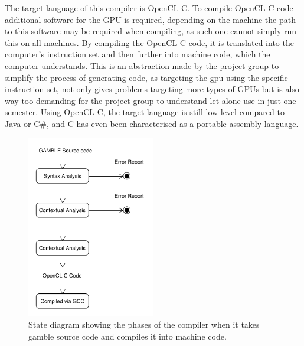 The target language of this compiler is OpenCL C.
To compile OpenCL C code additional software for the GPU is required, depending on the machine the path to this software may be required when compiling, as such one cannot simply run this on all machines.
By compiling the OpenCL C code, it is translated into the computer's instruction set and then further into machine code, which the computer understands.
This is an abstraction made by the project group to simplify the process of generating code, as targeting the \acrshort{gpu} using the specific instruction set, not only gives problems targeting more types of GPUs but is also way too demanding for the project group to understand let alone use in just one semester.
Using OpenCL C, the target language is still low level compared to Java or C\#, and C has even been characterised as a portable assembly language.\citep{CPort}

\begin{figure}
\centering
\includegraphics[width=0.5\textwidth]{figures/ClassDiagrams/CompilerDiagram.pdf}
\caption{State diagram showing the phases of the compiler when it takes \gls{gamble} source code and compiles it into machine code.}\label{fig:phases}
\end{figure}



